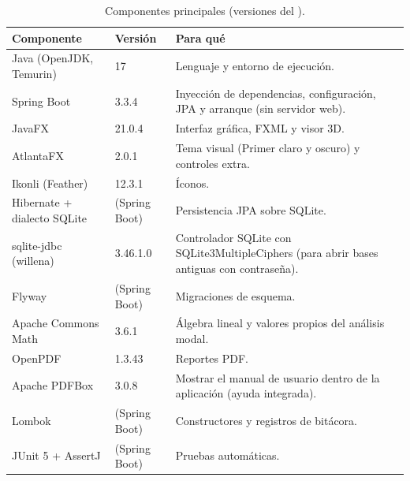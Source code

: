 \begin{table}[H]
	\centering
	\caption{Componentes principales (versiones del ).}
	\label{tab:t-tecnologias}
	\begin{tabular}{L{4.4cm}L{2.2cm}L{7.2cm}}
		\hline
		\textbf{Componente} & \textbf{Versión} & \textbf{Para qué} \\ \hline
		Java (OpenJDK, Temurin) & 17 & Lenguaje y entorno de ejecución. \\
		Spring Boot & 3.3.4 & Inyección de dependencias, configuración, JPA y arranque (sin servidor web). \\
		JavaFX & 21.0.4 & Interfaz gráfica, FXML y visor 3D. \\
		AtlantaFX & 2.0.1 & Tema visual (Primer claro y oscuro) y controles extra. \\
		Ikonli (Feather) & 12.3.1 & Íconos. \\
		Hibernate + dialecto SQLite & (Spring Boot) & Persistencia JPA sobre SQLite. \\
		sqlite-jdbc (willena) & 3.46.1.0 & Controlador SQLite con SQLite3MultipleCiphers (para abrir bases antiguas con
		contraseña). \\
		Flyway & (Spring Boot) & Migraciones de esquema. \\
		Apache Commons Math & 3.6.1 & Álgebra lineal y valores propios del análisis modal. \\
		OpenPDF & 1.3.43 & Reportes PDF. \\
		Apache PDFBox & 3.0.8 & Mostrar el manual de usuario dentro de la aplicación (ayuda integrada). \\
		Lombok & (Spring Boot) & Constructores y registros de bitácora. \\
		JUnit 5 + AssertJ & (Spring Boot) & Pruebas automáticas. \\ \hline
	\end{tabular}
\end{table}
